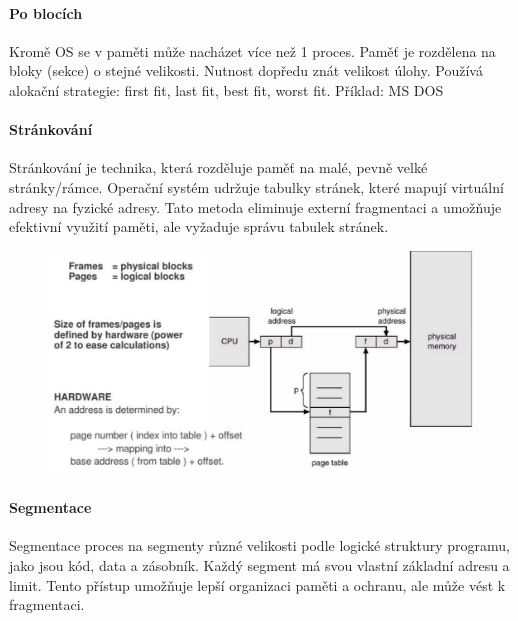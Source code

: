 \paragraph{Po blocích}
Kromě OS se v paměti může nacházet více než 1 proces. Paměť je rozdělena na bloky (sekce) o stejné velikosti. Nutnost dopředu znát velikost úlohy. Používá alokační strategie: first fit, last fit, best fit, worst fit. Příklad: MS DOS

\paragraph{Stránkování}
Stránkování je technika, která rozděluje paměť na malé, pevně velké stránky/rámce. Operační systém udržuje tabulky stránek, které mapují virtuální adresy na fyzické adresy. Tato metoda eliminuje externí fragmentaci a umožňuje efektivní využití paměti, ale vyžaduje správu tabulek stránek.

\begin{figure}[h]
    \centering
    \includegraphics[scale=0.3]{sections/8_riz_op_pam/images/Screenshot 2024-08-26 125926.png}

\end{figure}

\paragraph{Segmentace}
Segmentace proces na segmenty různé velikosti podle logické struktury programu, jako jsou kód, data a zásobník. Každý segment má svou vlastní základní adresu a limit. Tento přístup umožňuje lepší organizaci paměti a ochranu, ale může vést k fragmentaci.

